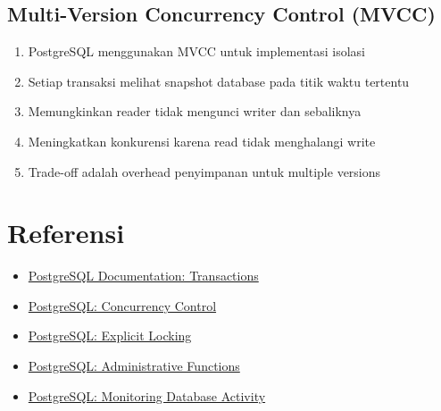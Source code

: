 \subsection{Multi-Version Concurrency Control (MVCC)}
\begin{enumerate}
    \item PostgreSQL menggunakan MVCC untuk implementasi isolasi
    \item Setiap transaksi melihat snapshot database pada titik waktu tertentu
    \item Memungkinkan reader tidak mengunci writer dan sebaliknya
    \item Meningkatkan konkurensi karena read tidak menghalangi write
    \item Trade-off adalah overhead penyimpanan untuk multiple versions
\end{enumerate}

\section{Referensi}

\begin{itemize}
    \item \href{https://www.postgresql.org/docs/current/transaction-iso.html}{PostgreSQL Documentation: Transactions}
    \item \href{https://www.postgresql.org/docs/current/mvcc.html}{PostgreSQL: Concurrency Control}
    \item \href{https://www.postgresql.org/docs/current/explicit-locking.html}{PostgreSQL: Explicit Locking}
    \item \href{https://www.postgresql.org/docs/current/functions-admin.html}{PostgreSQL: Administrative Functions}
    \item \href{https://www.postgresql.org/docs/current/monitoring-stats.html}{PostgreSQL: Monitoring Database Activity}
\end{itemize}

